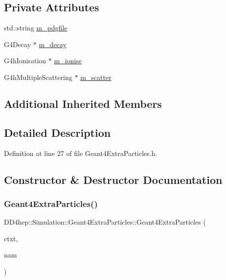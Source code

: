 \subsection*{Private Attributes}
\begin{DoxyCompactItemize}
\item 
std\+::string \hyperlink{class_d_d4hep_1_1_simulation_1_1_geant4_extra_particles_ac50ed0b5305835df3be2537c93483d6b}{m\+\_\+pdgfile}
\item 
G4\+Decay $\ast$ \hyperlink{class_d_d4hep_1_1_simulation_1_1_geant4_extra_particles_a83b8c92a3c21c6068ddfe5f93ac650df}{m\+\_\+decay}
\item 
G4h\+Ionisation $\ast$ \hyperlink{class_d_d4hep_1_1_simulation_1_1_geant4_extra_particles_a3a1a935a2a36d8e61af6c632fa7b847b}{m\+\_\+ionise}
\item 
G4h\+Multiple\+Scattering $\ast$ \hyperlink{class_d_d4hep_1_1_simulation_1_1_geant4_extra_particles_ac682ea9380ab2726b966bd9829b279c4}{m\+\_\+scatter}
\end{DoxyCompactItemize}
\subsection*{Additional Inherited Members}


\subsection{Detailed Description}


Definition at line 27 of file Geant4\+Extra\+Particles.\+h.



\subsection{Constructor \& Destructor Documentation}
\hypertarget{class_d_d4hep_1_1_simulation_1_1_geant4_extra_particles_a6010ec49bacd3f02f24ee026fe0aac3f}{}\label{class_d_d4hep_1_1_simulation_1_1_geant4_extra_particles_a6010ec49bacd3f02f24ee026fe0aac3f} 
\subsubsection{\texorpdfstring{Geant4\+Extra\+Particles()}{Geant4ExtraParticles()}}
{\footnotesize\ttfamily D\+D4hep\+::\+Simulation\+::\+Geant4\+Extra\+Particles\+::\+Geant4\+Extra\+Particles (\begin{DoxyParamCaption}\item[{\hyperlink{class_d_d4hep_1_1_simulation_1_1_geant4_context}{Geant4\+Context} $\ast$}]{ctxt,  }\item[{const std\+::string \&}]{nam }\end{DoxyParamCaption})}



